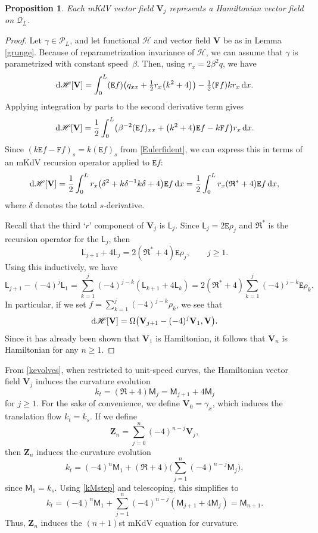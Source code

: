 \documentclass[10pt,a4paper]{amsart}
\def\opR{\mathfrak R}
\newcommand\Leg{ {\mathcal P}} %
\newcommand\Legq{\mathcal Q}
\def\Fop{\mathtt F} %
\def\Euler{\mathtt E}
\newcommand\uM{\mathsf M} %
\newcommand\uL{\mathsf L} %
\newcommand\kk{k} %
\newcommand\speed{\beta} %
\def\vecV{\mathbf V}
\newcommand\VV{\mathbf V}
\newcommand\VZ{\mathbf Z}
\newcommand\funH{{\mathscr H}} %
\newcommand{\dx}{\,{\rm d}x}
\def\gam{\gamma} %
\numberwithin{equation}{section}
\newtheorem{Proposition}[Theorem]{Proposition}
 { \theoremstyle{definition}
\newtheorem{Definition}[Theorem]{Definition}
\newtheorem{Note}[Theorem]{Note}
\newtheorem{Example}[Theorem]{Example}
\newtheorem{Remark}[Theorem]{Remark} }
\begin{document}
\begin{Proposition} Each mKdV vector field $\vecV_j$ represents a Hamiltonian vector field on $\Legq_L$.
\end{Proposition}

\begin{proof}
Let $\gam \in \Leg_L$, and let functional $\funH$ and vector field $\VV$ be as in Lemma \ref{grunge}. Because of reparametrization invariance of $\funH$, we can assume that $\gam$ is parametrized with constant speed~$\speed$. Then, using $r_x= 2\speed^2 q$, we have
\[{\rm d}\funH[\VV] = \int_0^L (\Euler f) \bigl( q_{xx} + \tfrac12 r_x \bigl(\kk^2 + 4\bigr)\bigr) - \tfrac12 (\Fop f)k r_x \dx.\]
Applying integration by parts to the second derivative term gives
\[{\rm d}\funH[\VV] =\frac12 \int_0^L \bigl( \beta^{-2} (\Euler f)_{xx} + \bigl(\kk^2+4\bigr) \Euler f - \kk \Fop f\bigr) r_x \dx.\]
Since $(\kk \Euler f -\Fop f)_s = \kk (\Euler f)_s$ from \eqref{Eulerfident}, we can express this in terms of an mKdV recursion operator applied to $\Euler f$:
\[
{\rm d}\funH[\VV] = \frac12 \int_0^L r_x \bigl(\delta^2 + \kk \delta^{-1} \kk \delta + 4\bigr) \Euler f \dx = \frac12 \int_0^L r_x (\opR^* + 4) \Euler f \dx,
\]
where $\delta$ denotes the total $s$-derivative.

Recall that the third `$r$' component of $\VV_j$ is $\uL_j$. Since $\uL_j = 2\Euler \rho_j$ and $\opR^*$ is the recursion operator for the $\uL_j$, then
\[\uL_{j+1} + 4 \uL_j = 2(\opR^* + 4)\Euler \rho_j, \qquad j\ge 1.\]
Using this inductively, we have
\[\uL_{j+1} - (-4)^j \uL_1 = \sum_{k=1}^j (-4)^{j-k} (\uL_{k+1} + 4 \uL_k) = 2 (\opR^* + 4) \sum_{k=1}^j (-4)^{j-k} \Euler \rho_k.\]
In particular, if we set $f = \sum_{k=1}^j (-4)^{j-k}\rho_k$, we see that
\[{\rm d}\funH[\VV] = \Omega\bigl(\vecV_{j+1} -(-4)^j \vecV_1, \VV\bigr).\]
Since it has already been shown that $\vecV_1$ is Hamiltonian, it follows that $\vecV_{n}$ is Hamiltonian for any $n\ge 1$.
\end{proof}

From \eqref{kevolves}, when restricted to unit-speed curves, the Hamiltonian vector field $\vecV_j$ induces the curvature evolution
\begin{equation}\label{kMstep}
\kk_t = (\opR + 4) \uM_j = \uM_{j+1} + 4 \uM_j
\end{equation}
for $j\ge 1$. For the sake of convenience, we define $\vecV_0 = \gam_x$, which induces the translation flow $k_t = k_s$.
If we define
\[
\VZ_n = \sum_{j=0}^n (-4)^{n-j} \vecV_j,
\]
then $\VZ_n$ induces the curvature evolution
\[
\kk_t = (-4)^n \uM_1 + (\opR+4) \Biggl( \sum_{j=1}^n (-4)^{n-j} \uM_j \Biggr),
\]
since $\uM_1 = \kk_s$. Using \eqref{kMstep} and telescoping, this simplifies to
\[\kk_t = (-4)^n \uM_1 +\sum_{j=1}^n (-4)^{n-j} (\uM_{j+1} + 4 \uM_j) = \uM_{n+1}.\]
Thus, $\VZ_n$ induces the $(n+1)$st mKdV equation for curvature.
\end{document}
